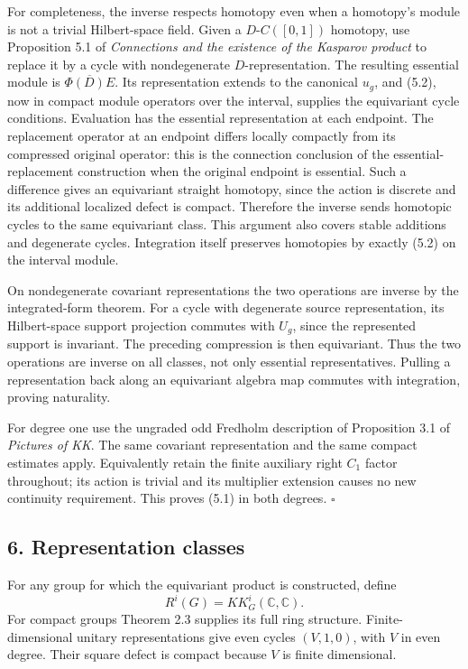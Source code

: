 \documentclass[
  11pt,
]{article}
\begin{document}
For completeness, the inverse respects homotopy even when a homotopy's
module is not a trivial Hilbert-space field. Given a \(D\)-\(C([0,1])\)
homotopy, use Proposition 5.1 of \emph{Connections and the existence of
the Kasparov product} to replace it by a cycle with nondegenerate
\(D\)-representation. The resulting essential module is
\(\overline{\Phi(D)E}\). Its representation extends to the canonical
\(u_g\), and (5.2), now in compact module operators over the interval,
supplies the equivariant cycle conditions. Evaluation has the essential
representation at each endpoint. The replacement operator at an endpoint
differs locally compactly from its compressed original operator: this is
the connection conclusion of the essential-replacement construction when
the original endpoint is essential. Such a difference gives an
equivariant straight homotopy, since the action is discrete and its
additional localized defect is compact. Therefore the inverse sends
homotopic cycles to the same equivariant class. This argument also
covers stable additions and degenerate cycles. Integration itself
preserves homotopies by exactly (5.2) on the interval module.

On nondegenerate covariant representations the two operations are
inverse by the integrated-form theorem. For a cycle with degenerate
source representation, its Hilbert-space support projection commutes
with \(U_g\), since the represented support is invariant. The preceding
compression is then equivariant. Thus the two operations are inverse on
all classes, not only essential representatives. Pulling a
representation back along an equivariant algebra map commutes with
integration, proving naturality.

For degree one use the ungraded odd Fredholm description of Proposition
3.1 of \emph{Pictures of KK}. The same covariant representation and the
same compact estimates apply. Equivalently retain the finite auxiliary
right \(C_1\) factor throughout; its action is trivial and its
multiplier extension causes no new continuity requirement. This proves
(5.1) in both degrees. \(\square\)

\subsection{6. Representation classes}\label{representation-classes}

For any group for which the equivariant product is constructed, define
\[
R^i(G)=KK_G^i(\mathbb C,\mathbb C).
\tag{6.1}
\] For compact groups Theorem 2.3 supplies its full ring structure.
Finite-dimensional unitary representations give even cycles \((V,1,0)\),
with \(V\) in even degree. Their square defect is compact because \(V\)
is finite dimensional.
\end{document}
